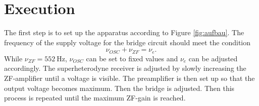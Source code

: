 \section{Execution}
The first step is to set up the apparatus according to Figure \ref{fig:aufbau}.
The frequency of the supply voltage for the bridge circuit should meet the condition
\begin{equation}
  \nu_{OSC}+\nu_{ZF}=\nu_e.
\end{equation}
While $\nu_{ZF}=\SI{552}{\hertz}$, $\nu_{OSC}$ can be set to fixed values and $\nu_e$ can be adjusted accordingly.
The superheterodyne receiver is adjusted by slowly increasing the ZF-amplifier until a voltage is visible.
The preamplifier is then set up so that the output voltage becomes maximum.
Then the bridge is adjusted. Then this process is repeated until the maximum ZF-gain is reached.
